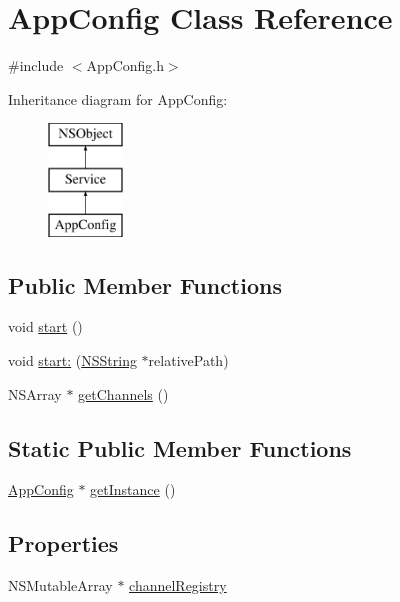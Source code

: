 \hypertarget{interface_app_config}{
\section{\-App\-Config \-Class \-Reference}
\label{interface_app_config}
}


{\ttfamily \#include $<$\-App\-Config.\-h$>$}

\-Inheritance diagram for \-App\-Config\-:\begin{figure}[H]
\begin{center}
\leavevmode
\includegraphics[height=3.000000cm]{interface_app_config}
\end{center}
\end{figure}
\subsection*{\-Public \-Member \-Functions}
\begin{DoxyCompactItemize}
\item 
void \hyperlink{interface_app_config_a6133c30ff8712d47169a695cf5e509a0}{start} ()
\item 
void \hyperlink{interface_app_config_adbd953903d20a0d5f54977be77772e42}{start\-:} (\hyperlink{class_n_s_string}{\-N\-S\-String} $\ast$relative\-Path)
\item 
\-N\-S\-Array $\ast$ \hyperlink{interface_app_config_a27b62438dca30dbb38905218c5bda8bc}{get\-Channels} ()
\end{DoxyCompactItemize}
\subsection*{\-Static \-Public \-Member \-Functions}
\begin{DoxyCompactItemize}
\item 
\hyperlink{interface_app_config}{\-App\-Config} $\ast$ \hyperlink{interface_app_config_a4f4dd8d26f64776452acf054a6d379ed}{get\-Instance} ()
\end{DoxyCompactItemize}
\subsection*{\-Properties}
\begin{DoxyCompactItemize}
\item 
\-N\-S\-Mutable\-Array $\ast$ \hyperlink{interface_app_config_a4c4c348fbeaa9b1c969c9e54664718f2}{channel\-Registry}
\end{DoxyCompactItemize}


